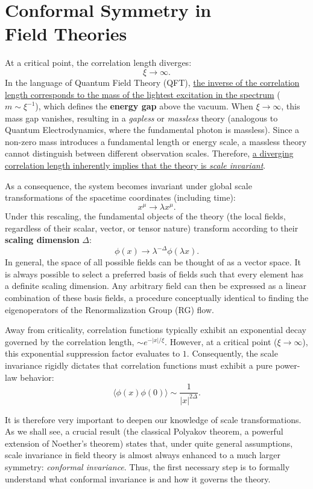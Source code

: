 \chapter[Conformal Symmetry in Field Theories]{Conformal Symmetry in \\Field Theories}

At a critical point, the correlation length diverges:
\[
    \xi\rightarrow\infty.
\]
In the language of Quantum Field Theory (QFT), \uline{the inverse of the correlation length corresponds to the mass of the lightest excitation in the spectrum} (\(m \sim \xi^{-1}\)), which defines the \textbf{energy gap} above the vacuum. When \(\xi \rightarrow \infty\), this mass gap vanishes, resulting in a \textit{gapless} or \textit{massless} theory (analogous to Quantum Electrodynamics, where the fundamental photon is massless). Since a non-zero mass introduces a fundamental length or energy scale, a massless theory cannot distinguish between different observation scales. Therefore, \uline{a diverging correlation length inherently implies that the theory is \textit{scale invariant}}.

As a consequence, the system becomes invariant under global scale transformations of the spacetime coordinates (including time):
\[
    x^{\mu}\rightarrow\lambda x^{\mu}.
\]
Under this rescaling, the fundamental objects of the theory (the local fields, regardless of their scalar, vector, or tensor nature) transform according to their \textbf{scaling dimension} \(\Delta\):
\[
    \phi(x)\rightarrow\lambda^{-\Delta}\phi(\lambda x).
\]
In general, the space of all possible fields can be thought of as a vector space. It is always possible to select a preferred basis of fields such that every element has a definite scaling dimension. Any arbitrary field can then be expressed as a linear combination of these basis fields, a procedure conceptually identical to finding the eigenoperators of the Renormalization Group (RG) flow.

Away from criticality, correlation functions typically exhibit an exponential decay governed by the correlation length, \(\sim e^{-|x|/\xi}\). However, at a critical point (\(\xi \rightarrow \infty\)), this exponential suppression factor evaluates to \(1\). Consequently, the scale invariance rigidly dictates that correlation functions must exhibit a pure power-law behavior:
\[
    \langle\phi(x)\phi(0)\rangle\sim\frac{1}{|x|^{2\Delta}}.
\]

It is therefore very important to deepen our knowledge of scale transformations. As we shall see, a crucial result (the classical Polyakov theorem, a powerful extension of Noether's theorem) states that, under quite general assumptions, scale invariance in field theory is almost always enhanced to a much larger symmetry: \textit{conformal invariance}. Thus, the first necessary step is to formally understand what conformal invariance is and how it governs the theory.

